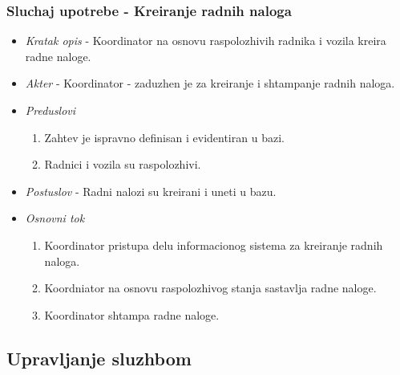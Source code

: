 \documentclass[10 pt]{article}
\begin{document}
	
	\subsubsection{Sluchaj upotrebe - Kreiranje radnih naloga}
	
		\begin{itemize}
		
			\item\textit{Kratak opis} - Koordinator na osnovu raspolozhivih radnika i vozila kreira radne naloge.
			
			\item\textit{Akter} - Koordinator - zaduzhen je za kreiranje i shtampanje radnih naloga.
			
			\item\textit{Preduslovi}
				\begin{enumerate}
					\item Zahtev je ispravno definisan i evidentiran u bazi.
					\item Radnici i vozila su raspolozhivi.
				\end{enumerate}
			
			\item\textit{Postuslov} - Radni nalozi su kreirani i uneti u bazu.
			
			\item\textit{Osnovni tok}
				\begin{enumerate}
					\item Koordinator pristupa delu informacionog sistema za kreiranje radnih naloga.
					\item Koordniator na osnovu raspolozhivog stanja sastavlja radne naloge.
					\item Koordinator shtampa radne naloge.
				\end{enumerate}
			
		\end{itemize}
	
	
	\subsection{Upravljanje sluzhbom}
	
\end{document}
